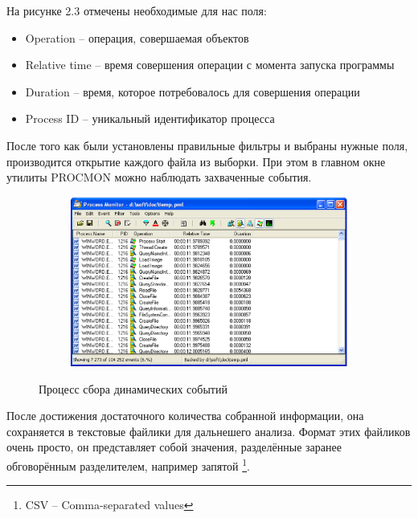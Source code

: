 На рисунке 2.3 отмечены необходимые для нас поля:
\begin{itemize}
\item Operation -- операция, совершаемая объектов
\item Relative time -- время совершения операции с момента запуска программы
\item Duration -- время, которое потребовалось для совершения операции
\item Process ID -- уникальный идентификатор процесса
\end{itemize}

После того как были установлены правильные фильтры и выбраны нужные поля, производится открытие каждого файла из выборки.
При этом в главном окне утилиты PROCMON можно наблюдать захваченные события.

\begin{figure}[ht]
	\centering
    \begin{subfigure}[b]{1\textwidth}
    \centering
        \includegraphics[scale=0.5]{procmon_events.png}        
    \end{subfigure}
 
    \caption{Процесс сбора динамических событий}
    \label{fig_parsetree}
\end{figure}

После достижения достаточного количества собранной информации, она сохраняется в текстовые файлики для дальнешего анализа.
Формат этих файликов очень просто, он представляет собой значения, разделённые заранее обговорённым разделителем, например запятой \footnote{CSV -- Comma-separated values}.

